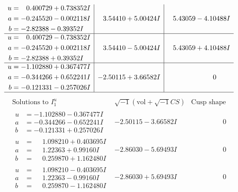 \documentclass[1p]{elsarticle_modified}
\theoremstyle{definition}
\newcommand{\I}{\sqrt{-1}}
\begin{document}
$$\begin{array}{c|c|c}
\begin{aligned}
u &= \phantom{-}0.400729 + 0.738352 I \\
a &= -0.245520 - 0.002118 I \\
b &= -2.82388 - 0.39352 I\end{aligned}
 & \phantom{-}3.54410 + 5.00424 I & \phantom{-}5.43059 - 4.10488 I \\ \hline\begin{aligned}
u &= \phantom{-}0.400729 - 0.738352 I \\
a &= -0.245520 + 0.002118 I \\
b &= -2.82388 + 0.39352 I\end{aligned}
 & \phantom{-}3.54410 - 5.00424 I & \phantom{-}5.43059 + 4.10488 I \\ \hline\begin{aligned}
u &= -1.102880 + 0.367477 I \\
a &= -0.344266 + 0.652241 I \\
b &= -0.121331 - 0.257026 I\end{aligned}
 & -2.50115 + 3.66582 I & \phantom{-0.000000 } 0\\
 \hline 
 \end{array}$$\newpage$$\begin{array}{c|c|c}  
\text{Solutions to }I^u_{1}& \I (\text{vol} + \sqrt{-1}CS) & \text{Cusp shape}\\
 \hline 
\begin{aligned}
u &= -1.102880 - 0.367477 I \\
a &= -0.344266 - 0.652241 I \\
b &= -0.121331 + 0.257026 I\end{aligned}
 & -2.50115 - 3.66582 I & \phantom{-0.000000 } 0 \\ \hline\begin{aligned}
u &= \phantom{-}1.098210 + 0.403695 I \\
a &= \phantom{-}1.22363 + 0.99160 I \\
b &= \phantom{-}0.259870 + 1.162480 I\end{aligned}
 & -2.86030 - 5.69493 I & \phantom{-0.000000 } 0 \\ \hline\begin{aligned}
u &= \phantom{-}1.098210 - 0.403695 I \\
a &= \phantom{-}1.22363 - 0.99160 I \\
b &= \phantom{-}0.259870 - 1.162480 I\end{aligned}
 & -2.86030 + 5.69493 I & \phantom{-0.000000 } 0 \\ \hline\begin{aligned}

\end{aligned}
\end{array}$$
\end{document}
